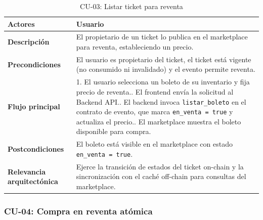 \documentclass[12pt,oneside]{article}
\begin{document}
\begin{table}[h!]
  \centering
  \begin{tabularx}{\textwidth}{@{}p{3.5cm} X@{}}
    \toprule
    \textbf{Actores} & Usuario\\
    \midrule
    \textbf{Descripción} & El propietario de un ticket lo publica en el marketplace para reventa, estableciendo un precio.\\
    \midrule
    \textbf{Precondiciones} & El usuario es propietario del ticket, el ticket está vigente (no consumido ni invalidado) y el evento permite reventa.\\
    \midrule
    \textbf{Flujo principal} &
      1. El usuario selecciona un boleto de su inventario y fija precio de reventa.\newline
      2. El frontend envía la solicitud al Backend API.\newline
      3. El backend invoca \texttt{listar\_boleto} en el contrato de evento, que marca \texttt{en\_venta = true} y actualiza el precio.\newline
      4. El marketplace muestra el boleto disponible para compra.\\
    \midrule
    \textbf{Postcondiciones} & El boleto está visible en el marketplace con estado \texttt{en\_venta = true}.\\
    \midrule
    \textbf{Relevancia arquitectónica} & Ejerce la transición de estados del ticket on-chain y la sincronización con el caché off-chain para consultas del marketplace.\\
    \bottomrule
  \end{tabularx}
  \caption{CU-03: Listar ticket para reventa}
  \label{tab:cu03}
\end{table}

\clearpage
\subsubsection{CU-04: Compra en reventa atómica}
\end{document}

